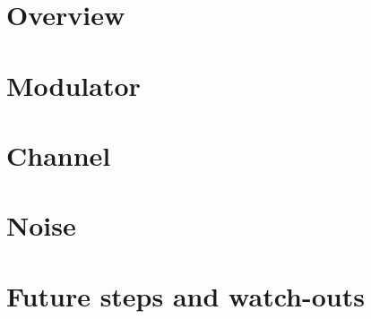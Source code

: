 \section{Overview}

\section{Modulator}

\section{Channel}

\section{Noise}

\section{Future steps and watch-outs}

